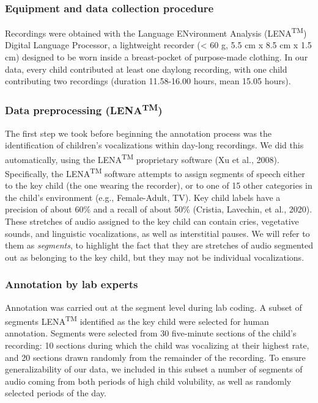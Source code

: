 \documentclass[english,,man,floatsintext]{apa6}
\begin{document}
\hypertarget{equipment-and-data-collection-procedure}{%
\subsubsection{Equipment and data collection procedure}\label{equipment-and-data-collection-procedure}}

Recordings were obtained with the Language ENvironment Analysis (LENA\textsuperscript{TM}) Digital Language Processor, a lightweight recorder (\textless{} 60 g, 5.5 cm x 8.5 cm x 1.5 cm) designed to be worn inside a breast-pocket of purpose-made clothing. In our data, every child contributed at least one daylong recording, with one child contributing two recordings (duration 11.58-16.00 hours, mean 15.05 hours).

\hypertarget{data-preprocessing-lenatm}{%
\subsubsection{\texorpdfstring{Data preprocessing (LENA\textsuperscript{TM})}{Data preprocessing (LENATM)}}\label{data-preprocessing-lenatm}}

The first step we took before beginning the annotation process was the identification of children's vocalizations within day-long recordings. We did this automatically, using the LENA\textsuperscript{TM} proprietary software (Xu et al., 2008). Specifically, the LENA\textsuperscript{TM} software attempts to assign segments of speech either to the key child (the one wearing the recorder), or to one of 15 other categories in the child's environment (e.g., Female-Adult, TV). Key child labels have a precision of about 60\% and a recall of about 50\% (Cristia, Lavechin, et al., 2020). These stretches of audio assigned to the key child can contain cries, vegetative sounds, and linguistic vocalizations, as well as interstitial pauses. We will refer to them as \emph{segments}, to highlight the fact that they are stretches of audio segmented out as belonging to the key child, but they may not be individual vocalizations.

\hypertarget{annotation-by-lab-experts}{%
\subsubsection{Annotation by lab experts}\label{annotation-by-lab-experts}}

Annotation was carried out at the segment level during lab coding. A subset of segments LENA\textsuperscript{TM} identified as the key child were selected for human annotation. Segments were selected from 30 five-minute sections of the child's recording: 10 sections during which the child was vocalizing at their highest rate, and 20 sections drawn randomly from the remainder of the recording. To ensure generalizability of our data, we included in this subset a number of segments of audio coming from both periods of high child volubility, as well as randomly selected periods of the day.
\end{document}
